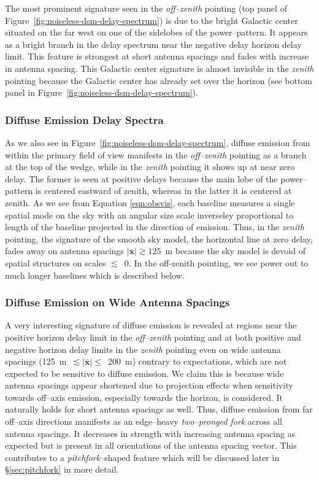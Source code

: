 \documentclass[preprint2,iop,numberedappendix]{emulateapj}
\begin{document}
The most prominent signature seen in the {\it off--zenith} pointing (top panel of Figure~\ref{fig:noiseless-dsm-delay-spectrum}) is due to the bright Galactic center situated on the far west on one of the sidelobes of the power--pattern. It appears as a bright branch in the delay spectrum near the negative delay horizon delay limit. This feature is strongest at short antenna spacings and fades with increase in antenna spacing. This Galactic center signature is almost invisible in the {\it zenith} pointing because the Galactic center has already set over the horizon (see bottom panel in Figure~\ref{fig:noiseless-dsm-delay-spectrum}). 

\subsubsection{Diffuse Emission Delay Spectra}\label{sec:diffuse-features}

As we also see in Figure~\ref{fig:noiseless-dsm-delay-spectrum}, diffuse emission from within the primary field of view manifests in the {\it off--zenith} pointing as a branch at the top of the wedge, while in the {\it zenith} pointing it shows up at near zero delay. The former is seen at positive delays because the main lobe of the power--pattern is centered eastward of zenith, whereas in the latter it is centered at zenith. As we see from Equation \ref{eqn:obsvis}, each baseline measures a single spatial mode on the sky with an angular size scale inverseley proportional to length of the baseline projected in the direction of emission. Thus, in the {\it zenith} pointing, the signature of the smooth sky model, the horizontal line at zero delay, fades away on antenna spacings $|\overline{\mathbf{x}}| \gtrsim 125$~m because the sky model is devoid of spatial structures on scales $\lesssim$~0. In the off-zenith pointing, we see power out to much longer baselines which is described below.

\subsubsection{Diffuse Emission on Wide Antenna Spacings}\label{sec:diffuse-long-baselines}

A very interesting signature of diffuse emission is revealed at regions near the positive horizon delay limit in the {\it off--zenith} pointing and at both positive and negative horizon delay limits in the {\it zenith} pointing even on wide antenna spacings (125~m~$\lesssim |\overline{\mathbf{x}}|\le$~200~m) contrary to expectations, which are not expected to be sensitive to diffuse emission. We claim this is because wide antenna spacings appear shortened due to projection effects when sensitivity towards off--axis emission, especially towards the horizon, is considered. It naturally holds for short antenna spacings as well. Thus, diffuse emission from far off--axis directions manifests as an edge--heavy {\it two--pronged fork} across all antenna spacings. It decreases in strength with increasing antenna spacing as expected but is present in all orientations of the antenna spacing vector. This contributes to a {\it pitchfork}--shaped feature which will be discussed later in \S\ref{sec:pitchfork} in more detail.
\end{document}
